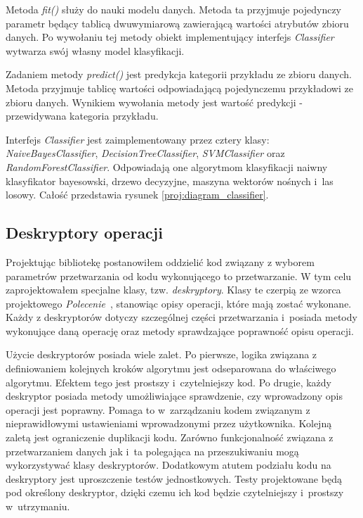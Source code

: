 \documentclass[../thesis.tex]{subfiles}
\begin{document}
Metoda \emph{fit()} służy do nauki modelu danych. Metoda ta przyjmuje pojedynczy parametr będący tablicą dwuwymiarową zawierającą wartości atrybutów zbioru danych. Po wywołaniu tej metody obiekt implementujący interfejs \emph{Classifier} wytwarza swój własny model klasyfikacji.

Zadaniem metody \emph{predict()} jest predykcja kategorii przykładu ze zbioru danych. Metoda przyjmuje tablicę wartości odpowiadającą pojedynczemu przykładowi ze zbioru danych. Wynikiem wywołania metody jest wartość predykcji - przewidywana kategoria przykładu.

Interfejs \emph{Classifier} jest zaimplementowany przez cztery klasy: \emph{NaiveBayesClassifier}, \emph{DecisionTreeClassifier}, \emph{SVMClassifier} oraz \emph{RandomForestClassifier}. Odpowiadają one algorytmom klasyfikacji naiwny klasyfikator bayesowski, drzewo decyzyjne, maszyna wektorów nośnych i~las losowy. Całość przedstawia rysunek \ref{proj:diagram_classifier}.

\subsection{Deskryptory operacji}
\label{proj:descriptors}

Projektując bibliotekę postanowiłem oddzielić kod związany z wyborem parametrów przetwarzania od kodu wykonującego to przetwarzanie. W tym celu zaprojektowałem specjalne klasy, tzw. \emph{deskryptory}. Klasy te czerpią ze wzorca projektowego \emph{Polecenie}~\cite{gang_of_four}, stanowiąc opisy operacji, które mają zostać wykonane. Każdy z deskryptorów dotyczy szczególnej części przetwarzania i~posiada metody wykonujące daną operację oraz metody sprawdzające poprawność opisu operacji.

Użycie deskryptorów posiada wiele zalet. Po pierwsze, logika związana z definiowaniem kolejnych kroków algorytmu jest odseparowana do właściwego algorytmu. Efektem tego jest prostszy i~czytelniejszy kod. Po drugie, każdy deskryptor posiada metody umożliwiające sprawdzenie, czy wprowadzony opis operacji jest poprawny. Pomaga to w~zarządzaniu kodem związanym z nieprawidłowymi ustawieniami wprowadzonymi przez użytkownika. Kolejną zaletą jest ograniczenie duplikacji kodu. Zarówno funkcjonalność związana z przetwarzaniem danych jak i~ta polegająca na przeszukiwaniu mogą wykorzystywać klasy deskryptorów. Dodatkowym atutem podziału kodu na deskryptory jest uproszczenie testów jednostkowych. Testy projektowane będą pod określony deskryptor, dzięki czemu ich kod będzie czytelniejszy i~prostszy w~utrzymaniu.
\end{document}
